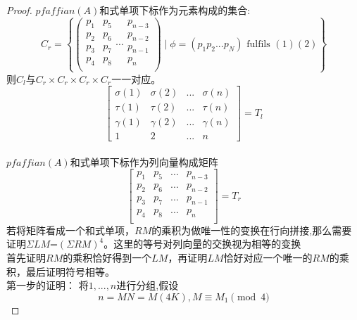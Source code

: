 \documentclass[twoside,a4paper,CCT]{cctart}   %
\begin{document}
\begin{proof}
$pfaffian(A)$和式单项下标作为元素构成的集合:
$$C_{r} =
\left\{              %
\left(
  \begin{array}{ccc}   %
    p_{1} \\  %
    p_{2} \\  %
    p_{3}\\
    p_{4}\\
  \end{array}              %
  \begin{array}{ccc}   %
    p_{5} \\  %
    p_{6} \\  %
    p_{7}\\
    p_{8}\\
  \end{array}
\cdots            %
  \begin{array}{ccc}   %
    p_{n-3} \\  %
    p_{n-2} \\  %
    p_{n-1}\\
    p_{n}\\
  \end{array}
\right)
\mid \phi=(p_{1}p_{2}...p_{N})\text{ fulfils }(1)(2)
\right\}$$
则$C_{l}$与$C_{r} \times C_{r}\times C_{r} \times C_{r} $一一对应。
\begin{equation}\begin{bmatrix}\sigma(1)&\sigma(2)&...&\sigma(n)\\ \tau(1)&\tau(2)&...&\tau(n)\\ \gamma(1)&\gamma(2)&...&\gamma(n)\\
1&2&...&n\end{bmatrix}=T_{l}\end{equation}\\
$pfaffian(A)$和式单项下标作为列向量构成矩阵\begin{equation}\begin{bmatrix}p_{1}&p_{5}&...&p_{n-3}\\p_{2}&p_{6}&...&p_{n-2}\\p_{3}&p_{7}&...&p_{n-1}\\p_{4}&p_{8}&...&p_{n}\\\end{bmatrix}=T_{r}\end{equation}
若将矩阵看成一个和式单项，$RM$的乘积为做唯一性的变换在行向拼接,那么需要证明$\Sigma LM$=$(\Sigma RM)^{4}$。这里的等号对列向量的交换视为相等的变换\\
首先证明$RM$的乘积恰好得到一个$LM$，再证明$LM$恰好对应一个唯一的$RM$的乘积，最后证明符号相等。\\
第一步的证明：
将$1,...,n$进行分组,假设$$n=MN=M(4K),M \equiv M_{1} \pmod{4} $$


\end{proof}
\end{document}
